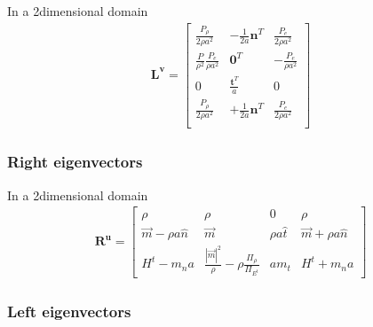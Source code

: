 \documentclass[letterpaper,10pt,english]{jupyterBook}
\begin{document}
\sphinxAtStartPar
In a 2\sphinxhyphen{}dimensional domain
\begin{equation*}
\begin{split}
\mathbf{L}^\mathbf{v} =
\begin{bmatrix}
 \frac{P_\rho}{2 \rho a^2} & - \frac{1}{2a} \mathbf{n}^T & \frac{P_e}{2 \rho a^2} \\
 \frac{P}{\rho^2} \frac{P_e}{\rho a^2} & \mathbf{0}^T & - \frac{P_e}{\rho a^2} \\
 0 & \frac{\mathbf{t}^T}{a} & 0 \\
 \frac{P_\rho}{2 \rho a^2} & + \frac{1}{2a} \mathbf{n}^T & \frac{P_e}{2 \rho a^2} \\
\end{bmatrix}
\end{split}
\end{equation*}
\sphinxAtStartPar
{}
\subsubsection*{Right eigenvectors}

\sphinxAtStartPar
In a 2\sphinxhyphen{}dimensional domain
\begin{equation*}
\begin{split}
\mathbf{R}^\mathbf{u} =
\begin{bmatrix}
  \rho                           & \rho                                                         & 0                 & \rho                      \\
  \vec{m} - \rho a \hat{n}       & \vec{m}                                                      & \rho a \hat{t}    & \vec{m} + \rho a \hat{n}  \\
  H^t - m_n a                    & \frac{|\vec{m}|^2}{\rho} - \rho \frac{\Pi_{\rho}}{\Pi_{E^t}} & a m_t             & H^t + m_n a                  
\end{bmatrix}
\end{split}
\end{equation*}\subsubsection*{Left eigenvectors}
\end{document}
